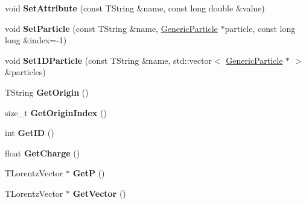 \begin{DoxyCompactItemize}
\item 
\hypertarget{class_h_a_l_1_1_generic_particle_aacce9b75bb12d4a0b2ad69d9784527d9}{void {\bfseries Set\+Attribute} (const T\+String \&name, const long double \&value)}\label{class_h_a_l_1_1_generic_particle_aacce9b75bb12d4a0b2ad69d9784527d9}

\item 
\hypertarget{class_h_a_l_1_1_generic_particle_a779773d398f0555bfe65295e16494156}{void {\bfseries Set\+Particle} (const T\+String \&name, \hyperlink{class_h_a_l_1_1_generic_particle}{Generic\+Particle} $\ast$particle, const long long \&index=-\/1)}\label{class_h_a_l_1_1_generic_particle_a779773d398f0555bfe65295e16494156}

\item 
\hypertarget{class_h_a_l_1_1_generic_particle_a3f6c3bcf5eb3fafc2687a0622404c5b1}{void {\bfseries Set1\+D\+Particle} (const T\+String \&name, std\+::vector$<$ \hyperlink{class_h_a_l_1_1_generic_particle}{Generic\+Particle} $\ast$ $>$ \&particles)}\label{class_h_a_l_1_1_generic_particle_a3f6c3bcf5eb3fafc2687a0622404c5b1}

\item 
\hypertarget{class_h_a_l_1_1_generic_particle_a712c5e92caba83c8c1f0566d860d6a1e}{T\+String {\bfseries Get\+Origin} ()}\label{class_h_a_l_1_1_generic_particle_a712c5e92caba83c8c1f0566d860d6a1e}

\item 
\hypertarget{class_h_a_l_1_1_generic_particle_a6b38ac523f31d45da86d153913a25643}{size\+\_\+t {\bfseries Get\+Origin\+Index} ()}\label{class_h_a_l_1_1_generic_particle_a6b38ac523f31d45da86d153913a25643}

\item 
\hypertarget{class_h_a_l_1_1_generic_particle_adb269fa3b951f48d41d46f29501849a0}{int {\bfseries Get\+I\+D} ()}\label{class_h_a_l_1_1_generic_particle_adb269fa3b951f48d41d46f29501849a0}

\item 
\hypertarget{class_h_a_l_1_1_generic_particle_a2f681e1590dd3644844d99267c8f74ed}{float {\bfseries Get\+Charge} ()}\label{class_h_a_l_1_1_generic_particle_a2f681e1590dd3644844d99267c8f74ed}

\item 
\hypertarget{class_h_a_l_1_1_generic_particle_a113c67f6413960990c922e2c5bf63455}{T\+Lorentz\+Vector $\ast$ {\bfseries Get\+P} ()}\label{class_h_a_l_1_1_generic_particle_a113c67f6413960990c922e2c5bf63455}

\item 
\hypertarget{class_h_a_l_1_1_generic_particle_a22f27923168040b2f8273b909830a7fa}{T\+Lorentz\+Vector $\ast$ {\bfseries Get\+Vector} ()}\label{class_h_a_l_1_1_generic_particle_a22f27923168040b2f8273b909830a7fa}


\end{DoxyCompactItemize}

